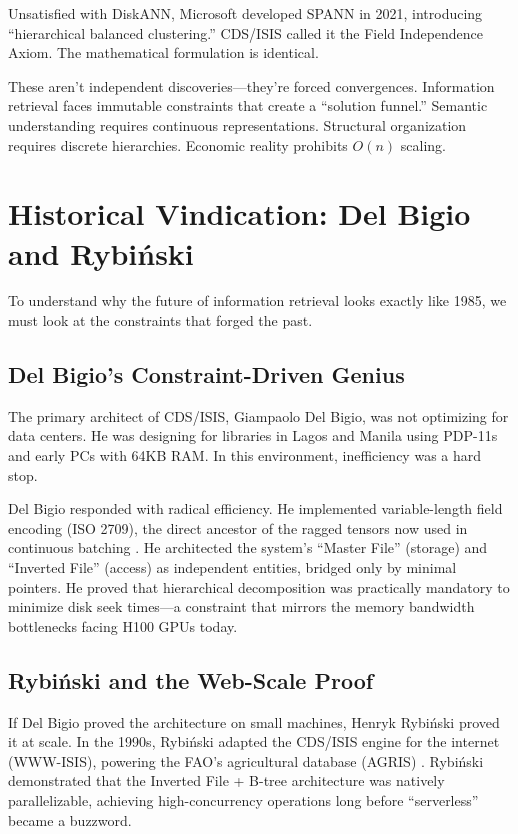 \documentclass[manuscript,screen,nonacm]{acmart}
\begin{document}
Unsatisfied with DiskANN, Microsoft developed SPANN in 2021, introducing ``hierarchical balanced clustering.'' CDS/ISIS called it the Field Independence Axiom. The mathematical formulation is identical.

These aren't independent discoveries---they're forced convergences. Information retrieval faces immutable constraints that create a ``solution funnel.'' Semantic understanding requires continuous representations. Structural organization requires discrete hierarchies. Economic reality prohibits $O(n)$ scaling.

\section{Historical Vindication: Del Bigio and Rybiński}

To understand why the future of information retrieval looks exactly like 1985, we must look at the constraints that forged the past.

\subsection{Del Bigio's Constraint-Driven Genius}
The primary architect of CDS/ISIS, Giampaolo Del Bigio, was not optimizing for data centers. He was designing for libraries in Lagos and Manila using PDP-11s and early PCs with 64KB RAM. In this environment, inefficiency was a hard stop.

Del Bigio responded with radical efficiency. He implemented variable-length field encoding (ISO 2709), the direct ancestor of the ragged tensors now used in continuous batching \cite{iso2709}. He architected the system's ``Master File'' (storage) and ``Inverted File'' (access) as independent entities, bridged only by minimal pointers. He proved that hierarchical decomposition was practically mandatory to minimize disk seek times---a constraint that mirrors the memory bandwidth bottlenecks facing H100 GPUs today.

\subsection{Rybiński and the Web-Scale Proof}
If Del Bigio proved the architecture on small machines, Henryk Rybiński proved it at scale. In the 1990s, Rybiński adapted the CDS/ISIS engine for the internet (WWW-ISIS), powering the FAO's agricultural database (AGRIS) \cite{rybinski1999}. Rybiński demonstrated that the Inverted File + B-tree architecture was natively parallelizable, achieving high-concurrency operations long before ``serverless'' became a buzzword.
\end{document}
